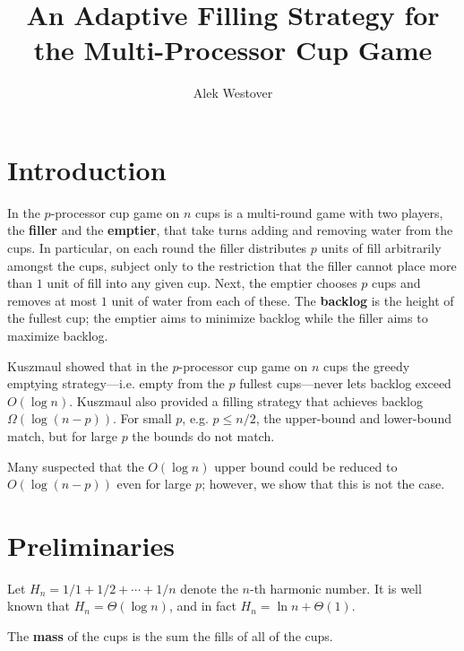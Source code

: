 \documentclass[twocolumn, 10pt]{article}
\author{Alek Westover}
\title{ An Adaptive Filling Strategy for the Multi-Processor Cup Game}
\date{}
\begin{document}
\maketitle
{}

\section{Introduction}
In the $p$-processor cup game on $n$ cups is a multi-round game
with two players, the \textbf{filler} and the \textbf{emptier},
that take turns adding and removing water from the cups. 
In particular, on each round the filler distributes $p$
units of fill arbitrarily amongst the cups, subject only to the
restriction that the filler cannot place more than $1$ unit of
fill into any given cup. Next, the emptier chooses $p$ cups and
removes at most $1$ unit of water from each of these.
The \textbf{backlog} is the height of the fullest cup; the emptier
aims to minimize backlog while the filler aims to maximize
backlog.

Kuszmaul showed that in the $p$-processor cup game on
$n$ cups the greedy emptying strategy---i.e. empty from the $p$
fullest cups---never lets backlog exceed $O(\log n)$. 
Kuszmaul also provided a filling strategy that achieves
backlog $\Omega(\log (n-p))$. 
For small $p$, e.g. $p \le n/2$, the upper-bound and lower-bound
match, but for large $p$ the bounds do not match. 

Many suspected that the $O(\log n)$ upper bound could be reduced
to $O(\log(n-p))$ even for large $p$; however, we show that this
is not the case.  

\section{Preliminaries}
Let $H_n = 1/1+1/2+\cdots +1/n$ denote the $n$-th harmonic
number. It is well known that $H_n = \Theta(\log n)$, and in fact
$H_n = \ln n + \Theta(1)$.

The \textbf{mass} of the cups is the sum the fills of all of the cups.
\end{document}

